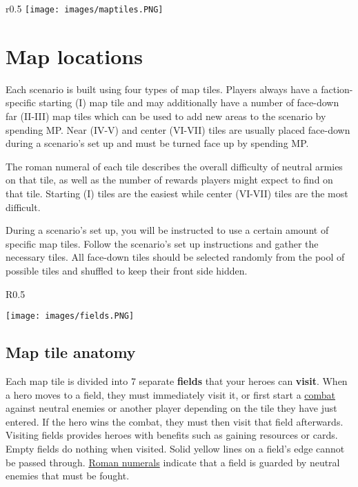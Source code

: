 \documentclass[12pt]{article}
\begin{document}
\clearpage

\begin{wrapfigure}{r}{0.5\textwidth}
\texttt{[image: images/maptiles.PNG]} 
\end{wrapfigure}
\section{Map locations}
Each scenario is built using four types of map tiles. Players always have a faction-specific starting (I) map tile and may additionally have a number of face-down far (II-III) map tiles which can be used to add new areas to the scenario by spending MP. Near (IV-V) and center (VI-VII) tiles are usually placed face-down during a scenario’s set up and must be turned face up by spending MP.\par
The roman numeral of each tile describes the overall difficulty of neutral armies on that tile, as well as the number of rewards players might expect to find on that tile. Starting (I) tiles are the easiest while center (VI-VII) tiles are the most difficult.\par
During a scenario’s set up, you will be instructed to use a certain amount of specific map tiles. Follow the scenario’s set up instructions and gather the necessary tiles. All face-down tiles should be selected randomly from the pool of possible tiles and shuffled to keep their front side hidden.\par
\begin{wrapfigure}{R}{0.5\textwidth}
    \begin{center}
    \texttt{[image: images/fields.PNG]}
    \end{center}
\end{wrapfigure}
\subsection*{Map tile anatomy}
Each map tile is divided into 7 separate \textbf{fields} that your heroes can \textbf{visit}. When a hero moves to a field, they must immediately visit it, or 
first start a \hyperlink{Combat}{combat} against neutral enemies or another player depending on the tile they have just entered. If the hero wins the combat, they must then visit that field afterwards. Visiting fields provides heroes with benefits such as gaining resources or cards. Empty fields do nothing when visited. Solid yellow lines on a field's edge cannot be passed through. \hyperlink{Difficulty}{Roman numerals} indicate that a field is guarded by neutral enemies that must be fought.\par
\end{document}

